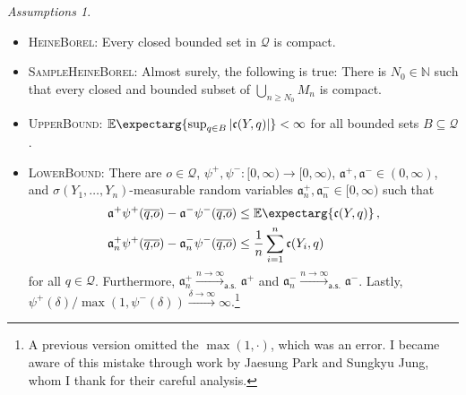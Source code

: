 \documentclass{scrartcl}
\renewcommand{\subset}{\subseteq}
\newcommand{\Ex}{\E\expectarg}
\newcommand*{\mc}[1]{\mathcal{#1}}
\newcommand*{\ms}[1]{\mathsf{#1}}
\newcommand*{\mf}[1]{\mathfrak{#1}}
\newcommand{\N}{\mathbb{N}}
\newcommand{\equationComma}{\, ,}
\newcommand{\eqcm}{\equationComma}
\theoremstyle{plain}\newtheorem{theorem}{Theorem}[section]
\theoremstyle{definition}
\theoremstyle{remark}
\newtheorem{assumptions}[theorem]{Assumptions}
\begin{document}
\begin{assumptions}\mbox{ }
\begin{itemize}
	\item \textsc{HeineBorel}: Every closed bounded set in $\mc Q$ is compact.
	\item \textsc{SampleHeineBorel}: Almost surely, the following is true: There is $N_0\in\N$ such that every closed and bounded subset of $\bigcup_{n\geq N_0} M_n$ is compact.
	\item \textsc{UpperBound}: $\Ex{\sup_{q\in B} \abs{\mf c(Y,q)}} < \infty$ for all bounded sets $B\subset\mc Q$.
	\item \textsc{LowerBound}: There are $o\in\mc Q$, $\psi^+, \psi^- \colon [0,\infty) \to [0,\infty)$, $\mf a^+, \mf a^- \in(0,\infty)$, and $\sigma(Y_1, \dots, Y_n)$-measurable random variables $\mf a^+_n, \mf a^-_n \in[0,\infty)$ such that 
	\begin{align*}
		\mf a^+ \psi^+(\ol qo) - \mf a^- \psi^-(\ol qo) &\leq \Ex{\mf c(Y, q)}
		\eqcm\\
		\mf a^+_n \psi^+(\ol qo) - \mf a^-_n \psi^-(\ol qo) &\leq \frac1n \sum_{i=1}^n \mf c(Y_i, q)
	\end{align*}
	for all $q\in\mc Q$. Furthermore, $\mf a^+_n\xrightarrow{n\to\infty}_{\ms{a.s.}}\mf a^+$ and $\mf a^-_n\xrightarrow{n\to\infty}_{\ms{a.s.}}\mf a^-$. Lastly, $\psi^+(\delta)/\max(1, \psi^-(\delta))\xrightarrow{\delta\to\infty}\infty$.\footnote{A previous version omitted the $\max(1,\cdot)$, which was an error. I became aware of this mistake through work by Jaesung Park and Sungkyu Jung, whom I thank for their careful analysis.}
	\end{itemize}
\end{assumptions}
\end{document}
